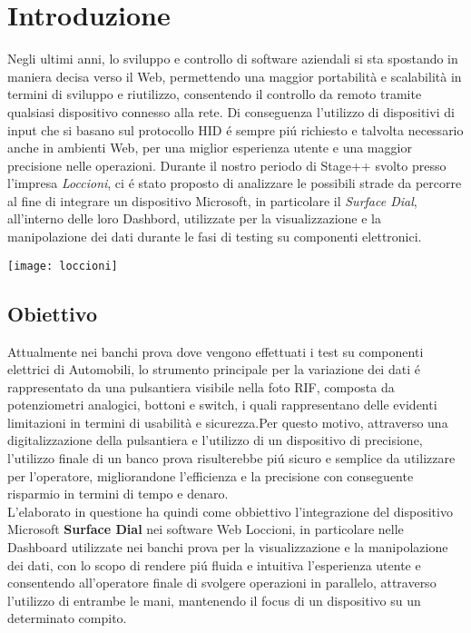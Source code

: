 \chapter{Introduzione}
\label{chap:intro}

Negli ultimi anni, lo sviluppo e controllo di software aziendali si sta spostando in maniera decisa verso il Web, permettendo una maggior portabilità e scalabilità in termini di sviluppo e riutilizzo, consentendo il controllo da remoto tramite qualsiasi dispositivo connesso alla rete. Di conseguenza l’utilizzo di dispositivi di input che si basano sul protocollo HID é sempre piú richiesto e talvolta necessario anche in ambienti Web, per una miglior esperienza utente e una maggior precisione nelle operazioni.
Durante il nostro periodo di Stage++ svolto presso l'impresa \emph{Loccioni}, ci é stato proposto di analizzare le possibili strade da percorre al fine di integrare un dispositivo Microsoft, in particolare il \emph{Surface Dial}, all'interno delle loro Dashbord, utilizzate per la visualizzazione e la manipolazione dei dati durante le fasi di testing su componenti elettronici.
\begin{center}
\texttt{[image: loccioni]}
\end{center}
\section{Obiettivo}
Attualmente nei banchi prova dove vengono effettuati i test su componenti elettrici di Automobili, lo strumento principale per la variazione dei dati é rappresentato da una pulsantiera visibile nella foto RIF, composta da potenziometri analogici, bottoni e switch, i quali rappresentano delle evidenti limitazioni in termini  di usabilità e sicurezza.Per questo motivo, attraverso una digitalizzazione della pulsantiera e l'utilizzo di un dispositivo di precisione, l'utilizzo finale di un banco prova risulterebbe piú sicuro e semplice da utilizzare per l'operatore, migliorandone l'efficienza e la precisione con conseguente risparmio in termini di tempo e denaro.\\

L'elaborato in questione ha quindi come obbiettivo l'integrazione del dispositivo Microsoft \textbf{Surface Dial} nei software Web Loccioni, in particolare nelle Dashboard utilizzate nei banchi prova per la visualizzazione e la manipolazione dei dati, con lo scopo di rendere piú fluida e intuitiva l'esperienza utente e consentendo all'operatore finale di svolgere operazioni in parallelo, attraverso l'utilizzo di entrambe le mani, mantenendo il focus di un dispositivo su un determinato compito.\\

